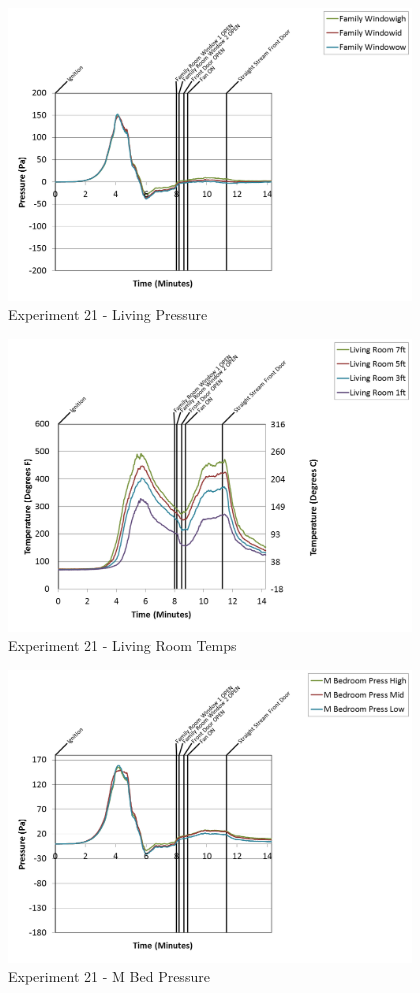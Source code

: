 \documentclass{article}
\begin{document}
\begin{appendices}
\clearpage

\begin{figure}[h!]
	\centering
	\includegraphics[height=3.05in]{0_Images/Results_Charts/Exp_21_Charts/LivingPressure.png}
	\caption{Experiment 21 - Living Pressure}
\end{figure}


\begin{figure}[h!]
	\centering
	\includegraphics[height=3.05in]{0_Images/Results_Charts/Exp_21_Charts/LivingRoomTemps.png}
	\caption{Experiment 21 - Living Room Temps}
\end{figure}

\clearpage

\begin{figure}[h!]
	\centering
	\includegraphics[height=3.05in]{0_Images/Results_Charts/Exp_21_Charts/MBedPressure.png}
	\caption{Experiment 21 - M Bed Pressure}
\end{figure}



\end{appendices}
\end{document}
